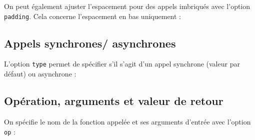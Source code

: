 \documentclass[a4paper,11pt]{report}
\newcommand{\inputTikZ}[1]{%
  }%
\newcommand{\inputTikZ}[1]{%
    \texttt{[image: fig/\#1.pdf]}%
  }%
\begin{document}
\medskip

On peut également ajuster l'espacement pour des appels imbriqués avec l'option {\tt padding}. Cela concerne l'espacement en bas uniquement :

\medskip

\begin{minipage}{0.5\textwidth}

\end{minipage}
\begin{minipage}{0.5\textwidth}
\begin{center}
\inputTikZ{callpadding}
\end{center}
\end{minipage}

\subsection{Appels synchrones/ asynchrones}\label{ss.callsync}

L'option {\tt type} permet de spécifier s'il s'agit d'un appel synchrone (valeur par défaut) ou asynchrone :

\medskip

\begin{minipage}{0.5\textwidth}

\end{minipage}
\begin{minipage}{0.5\textwidth}
\begin{center}
\inputTikZ{callsync}
\end{center}
\end{minipage}

\subsection{Opération, arguments et valeur de retour}\label{ss.callop}

On spécifie le nom de la fonction appelée et ses arguments d'entrée avec l'option {\tt op} :

\medskip

\begin{minipage}{0.5\textwidth}

\end{minipage}
\begin{minipage}{0.5\textwidth}
\begin{center}
\inputTikZ{callop}
\end{center}
\end{minipage}

\medskip
\end{document}
